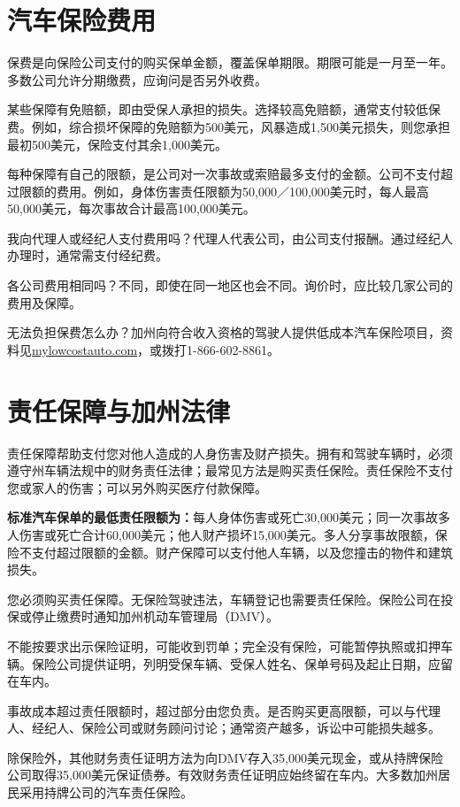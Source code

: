 \documentclass[UTF8,fontset=none,11pt,a4paper]{ctexart}
\begin{document}
\section*{汽车保险费用}
保费是向保险公司支付的购买保单金额，覆盖保单期限。期限可能是一月至一年。多数公司允许分期缴费，应询问是否\allowbreak\mbox{另外收费。}


某些保障有免赔额，即由受保人承担的损失。选择较高免赔额，通常支付较低保费。例如，综合损坏保障的免赔额为500美元，风暴造成1,500美元损失，则您承担最初500美元，保险支付其余1,000美元。


每种保障有自己的限额，是公司对一次事故或索赔最多支付的金额。公司不支付超过限额的费用。例如，身体伤害责任限额为50,000／100,000美元时，每人最高50,000美元，每次事故合计最高100,000美元。


我向代理人或经纪人支付费用吗？代理人代表公司，由公司支付报酬。通过经纪人办理时，通常需支\allowbreak\mbox{付经纪费。}


各公司费用相同吗？不同，即使在同一地区也会不同。询价时，应比较几家公司的费\allowbreak\mbox{用及保障。}


无法负担保费怎么办？加州向符合收入资格的驾驶人提供低成本汽车保险项目，资料见\url{mylowcostauto.com}，或拨打1-866-602-8861。


\section*{责任保障与加州法律}
责任保障帮助支付您对他人造成的人身伤害及财产损失。拥有和驾驶车辆时，必须遵守州车辆法规中的财务责任法律；最常见方法是购买责任保险。责任保险不支付您或家人的伤害；可以另外购买医疗\allowbreak\mbox{付款保障。}


\textbf{标准汽车保单的最低责任限额为：}每人身体伤害或死亡30,000美元；同一次事故多人伤害或死亡合计60,000美元；他人财产损坏15,000美元。多人分享事故限额，保险不支付超过限额的金额。财产保障可以支付他人车辆，以及您撞击的物件和\allowbreak\mbox{建筑损失。}


您必须购买责任保障。无保险驾驶违法，车辆登记也需要责任保险。保险公司在投保或停止缴费时通知加州机动车管理局（DMV）。


不能按要求出示保险证明，可能收到罚单；完全没有保险，可能暂停执照或扣押车辆。保险公司提供证明，列明受保车辆、受保人姓名、保单号码及起止日期，应\allowbreak\mbox{留在车内。}


事故成本超过责任限额时，超过部分由您负责。是否购买更高限额，可以与代理人、经纪人、保险公司或财务顾问讨论；通常资产越多，诉讼中可能\allowbreak\mbox{损失越多。}


除保险外，其他财务责任证明方法为向DMV存入35,000美元现金，或从持牌保险公司取得35,000美元保证债券。有效财务责任证明应始终留在车内。大多数加州居民采用持牌公司的汽车\allowbreak\mbox{责任保险。}
\end{document}

